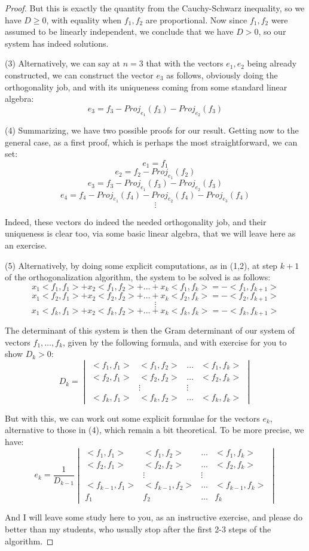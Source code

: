 \documentclass[12pt]{amsbook}
\begin{document}
\begin{proof}
But this is exactly the quantity from the Cauchy-Schwarz inequality, so we have $D\geq0$, with equality when $f_1,f_2$ are proportional. Now since $f_1,f_2$ were assumed to be linearly independent, we conclude that we have $D>0$, so our system has indeed solutions.

\medskip

(3) Alternatively, we can say at $n=3$ that with the vectors $e_1,e_2$ being already constructed, we can construct the vector $e_3$ as follows, obviously doing the orthogonality job, and with its uniqueness coming from some standard linear algebra:
$$e_3=f_3-Proj_{e_1}(f_3)-Proj_{e_2}(f_3)$$

(4) Summarizing, we have two possible proofs for our result. Getting now to the general case, as a first proof, which is perhaps the most straightforward, we can set:
$$e_1=f_1$$
$$e_2=f_2-Proj_{e_1}(f_2)$$
$$e_3=f_3-Proj_{e_1}(f_3)-Proj_{e_2}(f_3)$$
$$e_4=f_4-Proj_{e_1}(f_4)-Proj_{e_2}(f_4)-Proj_{e_3}(f_4)$$
$$\vdots$$

Indeed, these vectors do indeed the needed orthogonality job, and their uniqueness is clear too, via some basic linear algebra, that we will leave here as an exercise.

\medskip

(5) Alternatively, by doing some explicit computations, as in (1,2), at step $k+1$ of the orthogonalization algorithm, the system to be solved is as follows:
$$x_1<f_1,f_1>+x_2<f_1,f_2>+\ldots+x_k<f_1,f_k>=-<f_1,f_{k+1}>$$
$$x_1<f_2,f_1>+x_2<f_2,f_2>+\ldots+x_k<f_2,f_k>=-<f_2,f_{k+1}>$$
$$\vdots$$
$$x_1<f_k,f_1>+x_2<f_k,f_2>+\ldots+x_k<f_k,f_k>=-<f_k,f_{k+1}>$$

The determinant of this system is then the Gram determinant of our system of vectors $f_1,\ldots,f_k$, given by the following formula, and with exercise for you to show $D_k>0$:
$$D_k=\begin{vmatrix}
<f_1,f_1>&<f_1,f_2>&\ldots&<f_1,f_k>\\
<f_2,f_1>&<f_2,f_2>&\ldots&<f_2,f_k>\\
&\vdots&\vdots\\
<f_k,f_1>&<f_k,f_2>&\ldots&<f_k,f_k>
\end{vmatrix}$$

But with this, we can work out some explicit formulae for the vectors $e_k$, alternative to those in (4), which remain a bit theoretical. To be more precise, we have:
$$e_k=\frac{1}{D_{k-1}}\begin{vmatrix}
<f_1,f_1>&<f_1,f_2>&\ldots&<f_1,f_k>\\
<f_2,f_1>&<f_2,f_2>&\ldots&<f_2,f_k>\\
&\vdots&\vdots\\
<f_{k-1},f_1>&<f_{k-1},f_2>&\ldots&<f_{k-1},f_k>\\
f_1&f_2&\ldots&f_k
\end{vmatrix}$$

And I will leave some study here to you, as an instructive exercise, and please do better than my students, who usually stop after the first 2-3 steps of the algorithm.
\end{proof}
\end{document}
